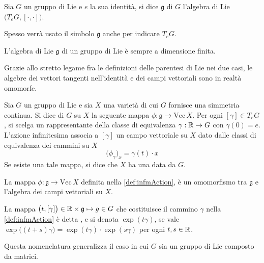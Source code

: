 \begin{definition}
  Sia $G$ un gruppo di Lie e $e$ la sua identità, si dice  $\mathfrak{g}$ di $G$ l'algebra di Lie $\big(T_e G, [\cdot ,\cdot ]\big)$.
\end{definition}
\begin{remark}
  Spesso verrà usato il simbolo $\mathfrak{g}$ anche per indicare $T_e G$.
\end{remark}
\begin{theorem}
  L'algebra di Lie $\mathfrak{g}$ di un gruppo di Lie è sempre a dimensione finita.
\end{theorem}

Grazie allo stretto legame fra le definizioni delle parentesi di Lie nei due casi, le algebre dei vettori tangenti nell'identità e dei campi vettoriali sono in realtà omomorfe.

\begin{definition} \label{def:infmAction}
  Sia $G$ un gruppo di Lie e sia $X$ una varietà di cui $G$ fornisce una simmetria continua. Si dice  di $G$ su $X$ la seguente mappa $\phi: \mathfrak{g} \to \mathrm{Vec}\, X$. Per ogni $[\gamma] \in T_e G$, si scelga un rappresentante della classe di equivalenza $\gamma:\mathbb{R}\to G$ con $\gamma(0) = e$. L'azione infinitesima associa a $[\gamma]$ un campo vettoriale su $X$ dato dalle classi di equivalenza dei cammini su $X$
  \begin{equation*}
  \big(\phi_{\gamma}\big)_x = \gamma(t) \cdot x
  \end{equation*}
  Se esiste una tale mappa, si dice che $X$ ha una  data da $G$.
\end{definition}
\begin{theorem}
  La mappa $\phi: \mathfrak{g} \to \mathrm{Vec}\, X$ definita nella \autoref{def:infmAction}, è un omomorfismo tra $\mathfrak{g}$ e l'algebra dei campi vettoriali su $X$.
\end{theorem}
\begin{definition}
  La mappa $\big(t, [\gamma]\big) \in \mathbb{R} \times  \mathfrak{g} \mapsto g \in G$ che costituisce il cammino $\gamma$ nella \autoref{def:infmAction} è detta , e si denota $\exp(t \gamma)$, se vale $\exp\big((t+s) \gamma\big) = \exp(t \gamma) \cdot  \exp (s \gamma)$ per ogni $t,s \in \mathbb{R}$.
\end{definition}
\begin{remark}
  Questa nomenclatura generalizza il caso in cui $G$ sia un gruppo di Lie composto da matrici.
\end{remark}

